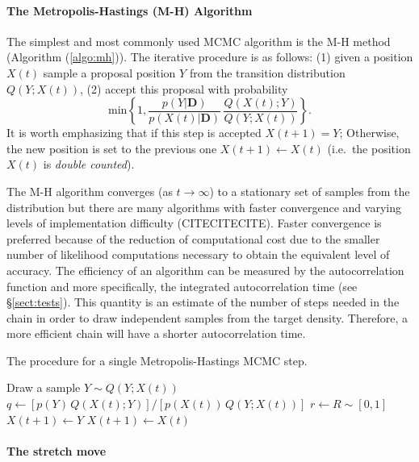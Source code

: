 \documentclass[12pt,preprint]{aastex}
\newcommand{\sect}[1]{\S\ref{sect:#1}}
\newcommand{\algo}[1]{Algorithm (\ref{algo:#1})}
\newcommand{\algolabel}[1]{\label{algo:#1}}
\newcommand{\bvec}[1]{\boldsymbol{#1}}
\newcommand{\paramvector}[1]{\bvec{#1}}
\renewcommand{\vector}[1]{#1}
\newcommand{\pr}{p}
\newcommand{\data}{\paramvector{D}}
\begin{document}
\paragraph{The Metropolis-Hastings (M-H) Algorithm}

The simplest and most commonly used MCMC algorithm is the M-H method
(\algo{mh}). The iterative procedure is as follows: (1) given a position
$X(t)$ sample a proposal position $Y$ from the transition distribution
$Q(Y; X(t))$, (2) accept this proposal with probability
\begin{equation}
    \mathrm{min} \left \{ 1,
            \frac{\pr(\vector{Y} | \data)}{\pr(\vector{X}(t) | \data)} \,
            \frac{Q(X(t); Y)}{ Q(Y;X(t))}  \right \}.
\end{equation}
It is worth emphasizing that if this step is accepted $X(t+1) = Y$; Otherwise,
the new position is set to the previous one $X(t+1) \gets X(t)$ (i.e.~the
position $X(t)$ is \emph{double counted}).

The M-H algorithm converges (as $t \to \infty$) to a stationary set of
samples from the distribution but there are many algorithms with faster
convergence and varying levels of implementation difficulty (CITECITECITE).
Faster convergence is preferred because of the reduction of computational
cost due to the smaller number of likelihood computations necessary to obtain
the equivalent level of accuracy. The efficiency of an algorithm can be
measured by the autocorrelation function and more specifically, the integrated
autocorrelation time (see \sect{tests}). This quantity is an estimate of the
number of steps needed in the chain in order to draw independent samples from
the target density. Therefore, a more efficient chain will have a shorter
autocorrelation time.

\begin{algorithm}
\caption{The procedure for a single Metropolis-Hastings MCMC step.
    \algolabel{mh}}
\begin{algorithmic}[1]

\STATE Draw a sample $Y \sim Q (Y; X(t))$
\STATE $q \gets [\pr(\vector{Y}) \, Q(X(t); Y)]
        / [\pr(\vector{X}(t)) \, Q(Y;X(t))]$
\STATE $r \gets R \sim [0, 1]$
    \STATE $\vector{X}(t+1) \gets \vector{Y}$
\ELSE
    \STATE $\vector{X}(t+1) \gets \vector{X}(t)$
\ENDIF

\end{algorithmic}
\end{algorithm}

\paragraph{The stretch move}
\end{document}
